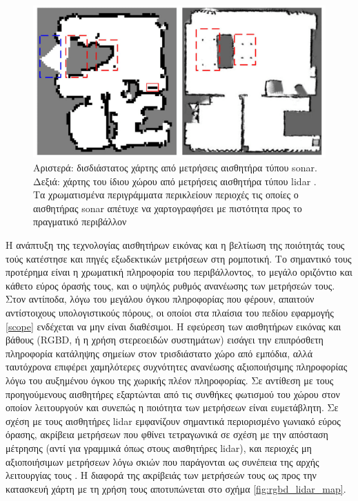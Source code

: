 \begin{figure}\centering
  \includegraphics[scale=0.5]{./figures/01.01.mobile_robotics/sonar_lidar_map.png}
  \caption{\small Αριστερά: δισδιάστατος χάρτης από μετρήσεις αισθητήρα τύπου sonar.
           Δεξιά: χάρτης του ίδιου χώρου από μετρήσεις αισθητήρα τύπου lidar
           \cite{Qi2020}. Τα χρωματισμένα περιγράμματα περικλείουν περιοχές τις
           οποίες ο αισθητήρας sonar απέτυχε να χαρτογραφήσει με πιστότητα προς
           το πραγματικό περιβάλλον}
  \label{fig:sonar_lidar_map}
\end{figure}

Η ανάπτυξη της τεχνολογίας αισθητήρων εικόνας και η βελτίωση της ποιότητάς τους
τούς κατέστησε και πηγές εξωδεκτικών μετρήσεων στη ρομποτική. Το σημαντικό
τους προτέρημα είναι η χρωματική πληροφορία του περιβάλλοντος, το μεγάλο
οριζόντιο και κάθετο εύρος όρασής τους, και ο υψηλός ρυθμός ανανέωσης των
μετρήσεών τους. Στον αντίποδα, λόγω του μεγάλου όγκου πληροφορίας που φέρουν,
απαιτούν αντίστοιχους υπολογιστικούς πόρους, οι οποίοι στα πλαίσια του πεδίου
εφαρμογής \ref{scope} ενδέχεται να μην είναι διαθέσιμοι. Η εφεύρεση των
αισθητήρων εικόνας και βάθους (RGBD, ή η χρήση στερεοειδών συστημάτων) εισάγει
την επιπρόσθετη πληροφορία κατάληψης σημείων στον τρισδιάστατο χώρο από
εμπόδια, αλλά ταυτόχρονα επιφέρει χαμηλότερες συχνότητες ανανέωσης
αξιοποιήσιμης πληροφορίας λόγω του αυξημένου όγκου της χωρικής πλέον
πληροφορίας. Σε αντίθεση με τους προηγούμενους αισθητήρες εξαρτώνται από τις
συνθήκες φωτισμού του χώρου στον οποίον λειτουργούν και συνεπώς η ποιότητα των
μετρήσεων είναι ευμετάβλητη. Σε σχέση με τους αισθητήρες lidar εμφανίζουν
σημαντικά περιορισμένο γωνιακό εύρος όρασης, ακρίβεια μετρήσεων που φθίνει
τετραγωνικά σε σχέση με την απόσταση μέτρησης (αντί για γραμμικά όπως στους
αισθητήρες lidar), και περιοχές μη αξιοποιήσιμων μετρήσεων λόγω σκιών που
παράγονται ως συνέπεια της αρχής λειτουργίας τους \cite{Mallick2014}. Η διαφορά
της ακρίβειάς των μετρήσεών τους ως προς την κατασκευή χάρτη με τη χρήση τους
αποτυπώνεται στο σχήμα \ref{fig:rgbd_lidar_map}.

